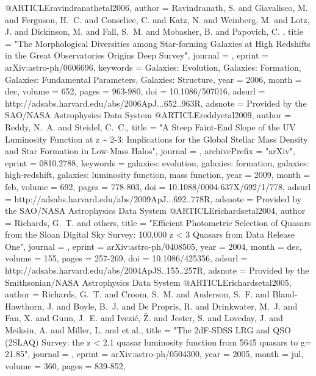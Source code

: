 {{{{{{{{{{{{{{{{{{{{{{{{{{{{{{{{{{{{{{{{{{{{{{{{{@ARTICLE{ravindranathetal2006,
   author = {{Ravindranath}, S. and {Giavalisco}, M. and {Ferguson}, H.~C. and 
	{Conselice}, C. and {Katz}, N. and {Weinberg}, M. and {Lotz}, J. and 
	{Dickinson}, M. and {Fall}, S.~M. and {Mobasher}, B. and {Papovich}, C.
	},
    title = "{The Morphological Diversities among Star-forming Galaxies at High Redshifts in the Great Observatories Origins Deep Survey}",
  journal = {\apj},
   eprint = {arXiv:astro-ph/0606696},
 keywords = {Galaxies: Evolution, Galaxies: Formation, Galaxies: Fundamental Parameters, Galaxies: Structure},
     year = 2006,
    month = dec,
   volume = 652,
    pages = {963-980},
      doi = {10.1086/507016},
   adsurl = {http://adsabs.harvard.edu/abs/2006ApJ...652..963R},
  adsnote = {Provided by the SAO/NASA Astrophysics Data System}
}
@ARTICLE{reddyetal2009,
   author = {{Reddy}, N.~A. and {Steidel}, C.~C.},
    title = "{A Steep Faint-End Slope of the UV Luminosity Function at z \~{} 2-3: Implications for the Global Stellar Mass Density and Star Formation in Low-Mass Halos}",
  journal = {\apj},
archivePrefix = "arXiv",
   eprint = {0810.2788},
 keywords = {galaxies: evolution, galaxies: formation, galaxies: high-redshift, galaxies: luminosity function, mass function},
     year = 2009,
    month = feb,
   volume = 692,
    pages = {778-803},
      doi = {10.1088/0004-637X/692/1/778},
   adsurl = {http://adsabs.harvard.edu/abs/2009ApJ...692..778R},
  adsnote = {Provided by the SAO/NASA Astrophysics Data System}
}
@ARTICLE{richardsetal2004,
   author = {{Richards}, G.~T. and others},
    title = "{Efficient Photometric Selection of Quasars from the Sloan Digital Sky Survey: 100,000 z < 3 Quasars from Data Release One}",
  journal = {\apjs},
   eprint = {arXiv:astro-ph/0408505},
     year = 2004,
    month = dec,
   volume = 155,
    pages = {257-269},
      doi = {10.1086/425356},
   adsurl = {http://adsabs.harvard.edu/abs/2004ApJS..155..257R},
  adsnote = {Provided by the Smithsonian/NASA Astrophysics Data System}
}
@ARTICLE{richardsetal2005,
   author = {{Richards}, G.~T. and {Croom}, S.~M. and {Anderson}, S.~F. and 
	{Bland-Hawthorn}, J. and {Boyle}, B.~J. and {De Propris}, R. and 
	{Drinkwater}, M.~J. and {Fan}, X. and {Gunn}, J.~E. and {Ivezi{\'c}}, {\v Z}. and 
	{Jester}, S. and {Loveday}, J. and {Meiksin}, A. and {Miller}, L. and 
         et al.},
    title = "{The 2dF-SDSS LRG and QSO (2SLAQ) Survey: the z < 2.1 quasar luminosity function from 5645 quasars to g= 21.85}",
  journal = {\mnras},
   eprint = {arXiv:astro-ph/0504300},
     year = 2005,
    month = jul,
   volume = 360,
    pages = {839-852},
}}}}}}}}}}}}}}}}}}}}}}}}}}}}}}}}}}}}}}}}}}}}}}}}}}

